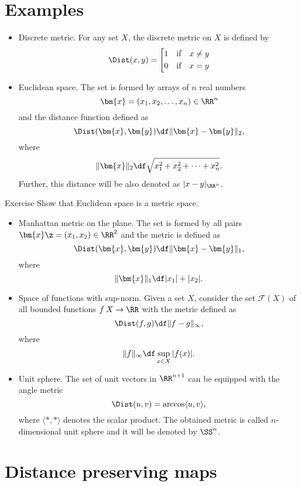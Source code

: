 \section*{Examples}
\begin{itemize}
\item Discrete metric. For any set $X$, the discrete metric on $X$ is defined by 
$$\Dist(x,y)=\left[
\begin{aligned}
&1&&\text{if}&x&\not=y
\\
&0&&\text{if}&x&=y
\end{aligned}
\right.$$

\item Euclidean space. 
The set is formed by arrays of $n$ real numbers
$$\bm{x}=(x_1,x_2,\dots,x_n)\in\RR^n$$
and the distance function defined as 
$$\Dist(\bm{x},\bm{y})
\df
\lVert\bm{x}-\bm{y}\rVert_2,$$
where 
$$\lVert\bm{x}\rVert_2
\df
\sqrt{x^2_1+x^2_2+\dots+x_n^2}.
$$
Further, this distance will be also denoted as $|x-y|_{\RR^n}$.
\end{itemize}

\begin{thm}{Exercise}\label{ex:Euclidean-is-metric}
Show that Euclidean space is a metric space.
\end{thm}

\begin{itemize}
\item \label{manhattan-metric} Manhattan metric on the plane. The set is formed by all pairs $\bm{x}\z=(x_1,x_2)\in\RR^2$ and the metric is defined as 
$$\Dist(\bm{x},\bm{y})
\df
\lVert\bm{x}-\bm{y}\rVert_1,$$
where 
$$\lVert\bm{x}\rVert_1
\df
|x_1|+|x_2|.
$$
\item %
Space of functions with sup-norm.
Given a set $X$,
consider the set $\mathcal{F}(X)$ of all bounded functions 
$f\: X\to\RR$ with the metric defined as
$$\Dist(f,g)
\df
\lVert f-g\rVert_\infty,$$
where
$$\lVert f\rVert_\infty
\df 
\sup_{x\in X}|f(x)|.
$$

\item Unit sphere.
The set of unit vectors in $\RR^{n+1}$ can be equipped with the angle metric 
$$\Dist(u,v)=\arccos\langle u,v\rangle,$$ 
where $\langle {*},{*}\rangle$ denotes the scalar product.
The obtained metric is called $n$-dimensional unit sphere and it will be denoted by $\SS^n$.
\end{itemize}

\section*{Distance preserving maps}

